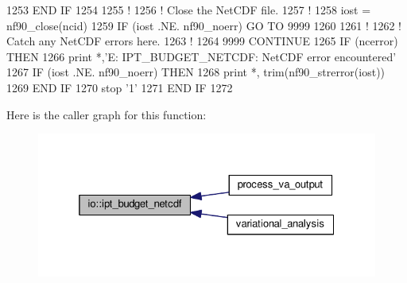 \begin{DoxyCode}
1253 \textcolor{keywordflow}{    END IF}
1254 
1255     \textcolor{comment}{!}
1256     \textcolor{comment}{! Close the NetCDF file.}
1257     \textcolor{comment}{!}
1258     iost    = nf90\_close(ncid)
1259     \textcolor{keywordflow}{IF} (iost .NE. nf90\_noerr) \textcolor{keywordflow}{GO TO} 9999
1260 
1261     \textcolor{comment}{!}
1262     \textcolor{comment}{! Catch any NetCDF errors here.}
1263     \textcolor{comment}{!}
1264     9999 \textcolor{keywordflow}{CONTINUE}
1265     \textcolor{keywordflow}{IF} (ncerror) \textcolor{keywordflow}{THEN}
1266         print *,\textcolor{stringliteral}{'E: IPT\_BUDGET\_NETCDF: NetCDF error encountered'}
1267         \textcolor{keywordflow}{IF} (iost .NE. nf90\_noerr) \textcolor{keywordflow}{THEN}
1268             print *, trim(nf90\_strerror(iost))
1269 \textcolor{keywordflow}{        END IF}
1270         stop \textcolor{stringliteral}{'1'}
1271 \textcolor{keywordflow}{    END IF}
1272 
\end{DoxyCode}


Here is the caller graph for this function\+:\nopagebreak
\begin{figure}[H]
\begin{center}
\leavevmode
\includegraphics[width=325pt]{namespaceio_aba707a842ac0a3e2e9def20af0b36c32_icgraph}
\end{center}
\end{figure}


